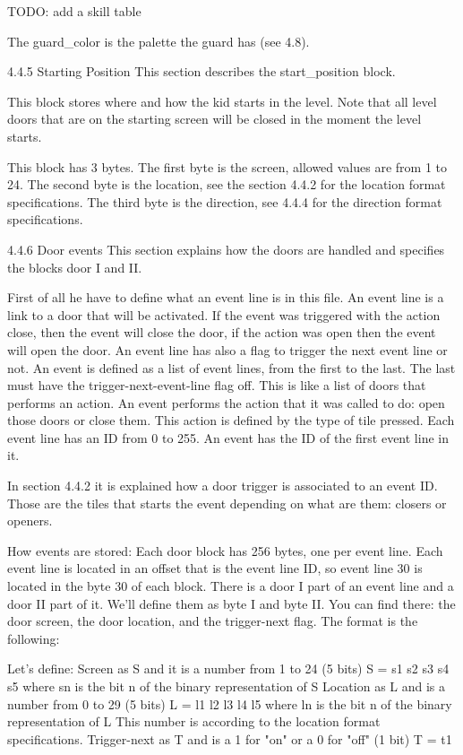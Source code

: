  TODO: add a skill table

 The guard_color is the palette the guard has (see 4.8).

4.4.5 Starting Position
 This section describes the start_position block.
 
 This block stores where and how the kid starts in the level. Note that all
 level doors that are on the starting screen will be closed in the moment
 the level starts.
 
 This block has 3 bytes.
 The first byte is the screen, allowed values are from 1 to 24.
 The second byte is the location, see the section 4.4.2 for the location
 format specifications.
 The third byte is the direction, see 4.4.4 for the direction format
 specifications.

4.4.6 Door events
 This section explains how the doors are handled and specifies the blocks
 door I and II.

 First of all he have to define what an event line is in this file. An event
 line is a link to a door that will be activated. If the event was triggered
 with the action close, then the event will close the door, if the action
 was open then the event will open the door. An event line has also a flag
 to trigger the next event line or not.
 An event is defined as a list of event lines, from the first to the last.
 The last must have the trigger-next-event-line flag off. This is like a
 list of doors that performs an action.
 An event performs the action that it was called to do: open those doors or
 close them. This action is defined by the type of tile pressed.
 Each event line has an ID from 0 to 255. An event has the ID of the first
 event line in it.

 In section 4.4.2 it is explained how a door trigger is associated to an
 event ID. Those are the tiles that starts the event depending on what are
 them: closers or openers.

 How events are stored:
 Each door block has 256 bytes, one per event line. Each event line is
 located in an offset that is the event line ID, so event line 30 is
 located in the byte 30 of each block.
 There is a door I part of an event line and a door II part of it. We'll
 define them as byte I and byte II.
 You can find there: the door screen, the door location, and the
 trigger-next flag. The format is the following:
 
 Let's define:
  Screen as S and it is a number from 1 to 24 (5 bits)
   S = s1 s2 s3 s4 s5
    where sn is the bit n of the binary representation of S
  Location as L and is a number from 0 to 29 (5 bits)
   L = l1 l2 l3 l4 l5
    where ln is the bit n of the binary representation of L
   This number is according to the location format specifications.
  Trigger-next as T and is a 1 for "on" or a 0 for "off" (1 bit)
   T = t1

